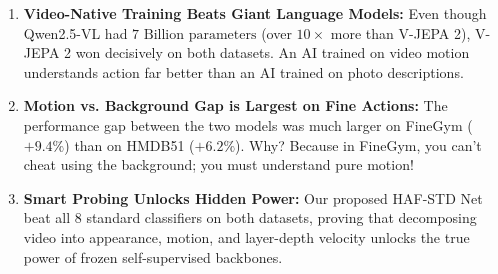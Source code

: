 \documentclass[a4paper, 11pt]{article}
\begin{document}
\begin{defensebox}
\begin{enumerate}
    \item \textbf{Video-Native Training Beats Giant Language Models:} Even though Qwen2.5-VL had $7\text{ Billion parameters}$ (over $10\times$ more than V-JEPA 2), V-JEPA 2 won decisively on both datasets. An AI trained on video motion understands action far better than an AI trained on photo descriptions.
    \item \textbf{Motion vs. Background Gap is Largest on Fine Actions:} The performance gap between the two models was much larger on FineGym ($+9.4\%$) than on HMDB51 ($+6.2\%$). Why? Because in FineGym, you can't cheat using the background; you must understand pure motion!
    \item \textbf{Smart Probing Unlocks Hidden Power:} Our proposed HAF-STD Net beat all 8 standard classifiers on both datasets, proving that decomposing video into appearance, motion, and layer-depth velocity unlocks the true power of frozen self-supervised backbones.
\end{enumerate}
\end{defensebox}
\end{document}
